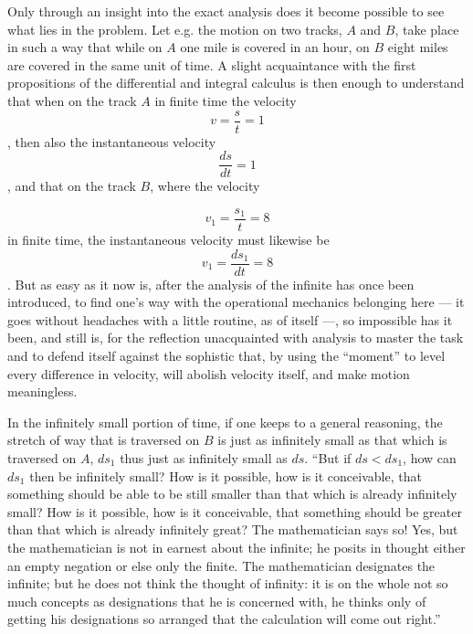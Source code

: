 \documentclass[12pt,a4paper,openany]{book}
\newcommand{\opage}[1]{\marginnote{\footnotesize\textit{[#1]}}}
\begin{document}
Only through an insight into the exact analysis does it become possible to see what lies in the problem. Let e.g. the motion on two tracks, $A$ and $B$, take place in such a way that
\setcounter{footnote}{0}%
\opage{142}while on $A$ one mile is covered in an hour, on $B$ eight miles are covered in the same unit of time. A slight acquaintance with the first propositions of the differential and integral calculus is then enough to understand that when on the track $A$ in finite time the velocity
\[ v=\frac{s}{t}=1 \]
, then also the instantaneous velocity
\[ \frac{ds}{dt}=1 \]
, and that on the track $B$, where the velocity

\[ v_{1}=\frac{s_{1}}{t}=8 \]
in finite time, the instantaneous velocity must likewise be
\[ v_{1}=\frac{ds_{1}}{dt}=8 \]
. But as easy as it now is, after the analysis of the infinite has once been introduced, to find one's way with the operational mechanics belonging here --- it goes without headaches with a little routine, as of itself ---, so impossible has it been, and still is, for the reflection unacquainted with analysis to master the task and to defend itself against the sophistic that, by using the ``moment'' to level every difference in velocity, will abolish velocity itself, and make motion meaningless.

In the infinitely small portion of time, if one keeps to a general reasoning, the stretch of way that is traversed on $B$ is just as infinitely small as that which is traversed on $A$, $ds_{1}$ thus just as infinitely small as $ds$. ``But if $ds<ds_{1}$, how can $ds_{1}$ then be infinitely small? How is it possible, how is it conceivable, that something should be able to be still smaller than that which is already infinitely small? How is it possible, how is it conceivable, that something should be greater than that which is already infinitely great? The mathematician says so! Yes, but the mathematician is not in earnest about the infinite; he posits in thought either an empty negation or else only the finite. The mathematician designates the infinite; but he does not think the thought of infinity: it is on the whole not so much concepts as
\setcounter{footnote}{0}%
\opage{143}designations that he is concerned with, he thinks only of getting his designations so arranged that the calculation will come out right.''
\end{document}
